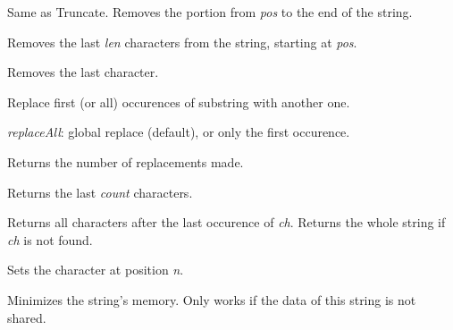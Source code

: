\label{wxstringRemove}


Same as Truncate. Removes the portion from {\it pos} to the end of the string.


Removes the last {\it len} characters from the string, starting at {\it pos}.

\label{wxstringremovelast}


Removes the last character.

\label{wxstringReplace}


Replace first (or all) occurences of substring with another one.

{\it replaceAll}: global replace (default), or only the first occurence.

Returns the number of replacements made.

\label{wxstringright}


Returns the last {\it count} characters.


Returns all characters after the last occurence of {\it ch}.
Returns the whole string if {\it ch} is not found.

\label{wxstringsetchar}


Sets the character at position {\it n}.

\label{wxstringshrink}


Minimizes the string's memory. Only works if the data of this string is not shared.

\label{wxstringsprintf}



